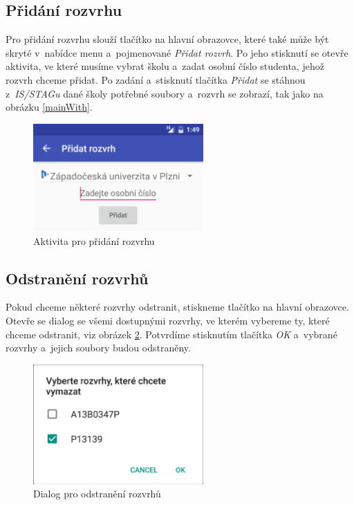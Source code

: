 \documentclass[12pt, a4paper]{article}
\begin{document}
		\subsection{Přidání rozvrhu}
		Pro přidání rozvrhu slouží tlačítko  na hlavní obrazovce, které také může být skryté v~nabídce menu a~pojmenované \emph{Přidat rozvrh}. Po jeho stisknutí se otevře aktivita, ve které musíme vybrat školu a~zadat osobní číslo studenta, jehož rozvrh chceme přidat. Po zadání a~stisknutí tlačítka \emph{Přidat} se stáhnou z~\emph{IS/STAGu} dané školy potřebné soubory a~rozvrh se zobrazí, tak jako na obrázku \ref{mainWith}.
		
		\begin{figure}[ht!]
			\centering
			\caption{Aktivita pro přidání rozvrhu}
			\label{addTimetable}
			\includegraphics[width=6.5cm]{img/addTimetable.png}
		\end{figure}
		\FloatBarrier
		
		\subsection{Odstranění rozvrhů}
		Pokud chceme některé rozvrhy odstranit, stiskneme tlačítko  na hlavní obrazovce. Otevře se dialog se všemi dostupnými rozvrhy, ve kterém vybereme ty, které chceme odstranit, viz obrázek \ref{deleteTimetables}. Potvrdíme stisknutím tlačítka \emph{OK} a~vybrané rozvrhy a~jejich soubory budou odstraněny.
		
		\begin{figure}[ht!]
			\centering
			\caption{Dialog pro odstranění rozvrhů}
			\label{deleteTimetables}
			\includegraphics[width=6.5cm]{img/deleteTimetables.png}
		\end{figure}
		\FloatBarrier
		
\end{document}

